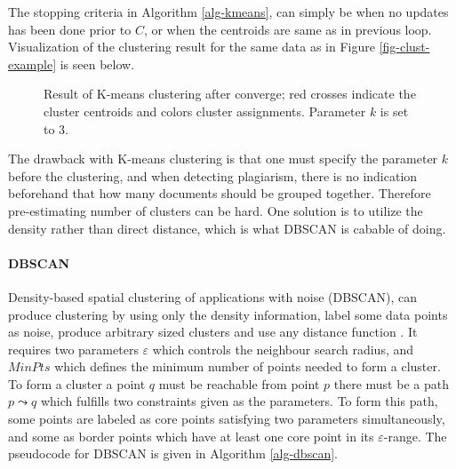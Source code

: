 \noindent 
The stopping criteria in Algorithm \ref{alg-kmeans}, can simply be when no updates has been done prior to $C$, or when the centroids are same as in previous loop. Visualization of the clustering result for the same data as in Figure \ref{fig-clust-example} is seen below.

\begin{figure}[!h]
\centering
\setlength\figureheight{8cm}
\setlength\figurewidth{8cm}

\caption{Result of K-means clustering after converge; red crosses indicate the cluster centroids and colors cluster assignments. Parameter $k$ is set to 3.} \label{fig-kmeans-example}
\end{figure}



The drawback with K-means clustering is that one must specify the parameter $k$ before the clustering, and when detecting plagiarism, there is no indication beforehand that how many documents should be grouped together. Therefore pre-estimating number of clusters can be hard. One solution is to utilize the density rather than direct distance, which is what DBSCAN is cabable of doing.

\paragraph{DBSCAN}

Density-based spatial clustering of applications with noise (DBSCAN), can produce clustering by using only the density information, label some data points as noise, produce arbitrary sized clusters and use any distance function \cite{Ester:1996:DAD:3001460.3001507}. It requires two parameters $\varepsilon$ which controls the neighbour search radius, and $MinPts$ which defines the minimum number of points needed to form a cluster. To form a cluster a point $q$ must be reachable from point $p$ \ie there must be a path $p \leadsto q$ which fulfills two constraints given as the parameters. To form this path, some points are labeled as core points satisfying two parameters simultaneously, and some as border points which have at least one core point in its $\varepsilon$-range. The pseudocode for DBSCAN is given in Algorithm \ref{alg-dbscan}.


